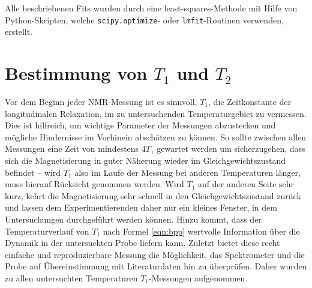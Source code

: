 Alle beschriebenen Fits wurden durch eine least-squares-Methode mit Hilfe von Python-Skripten, welche \texttt{scipy.optimize}- oder \texttt{lmfit}-Routinen verwenden, erstellt.


\section{Bestimmung von $T_1$ und $T_2$} \label{section:res:T_1}

Vor dem Beginn jeder NMR-Messung ist es sinnvoll, $T_1$, die Zeitkonstante der longitudinalen Relaxation, im zu untersuchenden Temperaturgebiet zu vermessen. Dies ist hilfreich, um wichtige Parameter der Messungen abzustecken und mögliche Hindernisse im Vorhinein abschätzen zu können. So sollte zwischen allen Messungen eine Zeit von mindestens $4 T_1$ gewartet werden um sicherzugehen, dass sich die Magnetisierung in guter Näherung wieder im Gleichgewichtszustand befindet -- wird $T_1$ also im Laufe der Messung bei anderen Temperaturen länger, muss hierauf Rücksicht genommen werden. Wird $T_1$ auf der anderen Seite sehr kurz, kehrt die Magnetisierung sehr schnell in den Gleichgewichtszustand zurück und lassen dem Experimentierenden daher nur ein kleines Fenster, in dem Untersuchungen durchgeführt werden können. Hinzu kommt, dass der Temperaturverlauf von $T_1$ nach Formel \eqref{eqn:bpp} wertvolle Information über die Dynamik in der untersuchten Probe liefern kann. Zuletzt bietet diese recht einfache und reproduzierbare Messung die Möglichkeit, das Spektrometer und die Probe auf Übereinstimmung mit Literaturdaten hin zu überprüfen. Daher wurden zu allen untersuchten Temperaturen $T_1$-Messungen aufgenommen.

